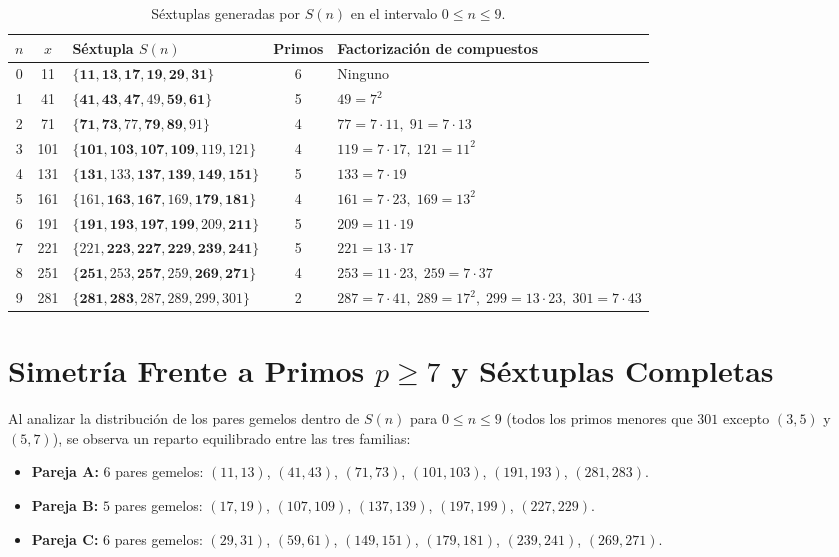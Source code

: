 \documentclass[11pt, a4paper]{article}
\begin{document}
\begin{table}[h!]
\centering
\caption{Séxtuplas generadas por $S(n)$ en el intervalo $0 \le n \le 9$.}
\label{tab:sextuplas}
\vspace{0.2cm}
\begin{tabular}{@{}c c l c l@{}}
\toprule
$n$ & $x$ & Séxtupla $S(n)$ & Primos & Factorización de compuestos \\
\midrule
0 & 11  & $\{\mathbf{11}, \mathbf{13}, \mathbf{17}, \mathbf{19}, \mathbf{29}, \mathbf{31}\}$ & 6 & Ninguno \\
1 & 41  & $\{\mathbf{41}, \mathbf{43}, \mathbf{47}, 49, \mathbf{59}, \mathbf{61}\}$ & 5 & $49 = 7^2$ \\
2 & 71  & $\{\mathbf{71}, \mathbf{73}, 77, \mathbf{79}, \mathbf{89}, 91\}$ & 4 & $77 = 7 \cdot 11,\; 91 = 7 \cdot 13$ \\
3 & 101 & $\{\mathbf{101}, \mathbf{103}, \mathbf{107}, \mathbf{109}, 119, 121\}$ & 4 & $119 = 7 \cdot 17,\; 121 = 11^2$ \\
4 & 131 & $\{\mathbf{131}, 133, \mathbf{137}, \mathbf{139}, \mathbf{149}, \mathbf{151}\}$ & 5 & $133 = 7 \cdot 19$ \\
5 & 161 & $\{161, \mathbf{163}, \mathbf{167}, 169, \mathbf{179}, \mathbf{181}\}$ & 4 & $161 = 7 \cdot 23,\; 169 = 13^2$ \\
6 & 191 & $\{\mathbf{191}, \mathbf{193}, \mathbf{197}, \mathbf{199}, 209, \mathbf{211}\}$ & 5 & $209 = 11 \cdot 19$ \\
7 & 221 & $\{221, \mathbf{223}, \mathbf{227}, \mathbf{229}, \mathbf{239}, \mathbf{241}\}$ & 5 & $221 = 13 \cdot 17$ \\
8 & 251 & $\{\mathbf{251}, 253, \mathbf{257}, 259, \mathbf{269}, \mathbf{271}\}$ & 4 & $253 = 11 \cdot 23,\; 259 = 7 \cdot 37$ \\
9 & 281 & $\{\mathbf{281}, \mathbf{283}, 287, 289, 299, 301\}$ & 2 & $287 = 7 \cdot 41,\; 289 = 17^2,\; 299 = 13 \cdot 23,\; 301 = 7 \cdot 43$ \\
\bottomrule
\end{tabular}
\end{table}

\section{Simetría Frente a Primos $p \ge 7$ y Séxtuplas Completas}

Al analizar la distribución de los pares gemelos dentro de $S(n)$ para $0 \le n \le 9$ (todos los primos menores que $301$ excepto $(3,5)$ y $(5,7)$), se observa un reparto equilibrado entre las tres familias:
\begin{itemize}
    \item \textbf{Pareja A:} $6$ pares gemelos: $(11,13)$, $(41,43)$, $(71,73)$, $(101,103)$, $(191,193)$, $(281,283)$.
    \item \textbf{Pareja B:} $5$ pares gemelos: $(17,19)$, $(107,109)$, $(137,139)$, $(197,199)$, $(227,229)$.
    \item \textbf{Pareja C:} $6$ pares gemelos: $(29,31)$, $(59,61)$, $(149,151)$, $(179,181)$, $(239,241)$, $(269,271)$.
\end{itemize}
\end{document}
